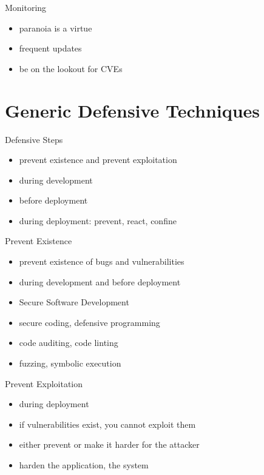 \documentclass{curs}
\begin{document}
\begin{frame}{Monitoring}
  \begin{itemize}
    \item paranoia is a virtue
    \item frequent updates
    \item be on the lookout for CVEs
  \end{itemize}
\end{frame}


\section{Generic Defensive Techniques}

\begin{frame}{Defensive Steps}
  \begin{itemize}
    \item prevent existence and prevent exploitation
    \item during development
    \item before deployment
    \item during deployment: prevent, react, confine
  \end{itemize}
\end{frame}

\begin{frame}{Prevent Existence}
  \begin{itemize}
    \item prevent existence of bugs and vulnerabilities
    \item during development and before deployment
    \item Secure Software Development
    \item secure coding, defensive programming
    \item code auditing, code linting
    \item fuzzing, symbolic execution
  \end{itemize}
\end{frame}

\begin{frame}{Prevent Exploitation}
  \begin{itemize}
    \item during deployment
    \item if vulnerabilities exist, you cannot exploit them
    \item either prevent or make it harder for the attacker
    \item harden the application, the system
  \end{itemize}
\end{frame}
\end{document}

